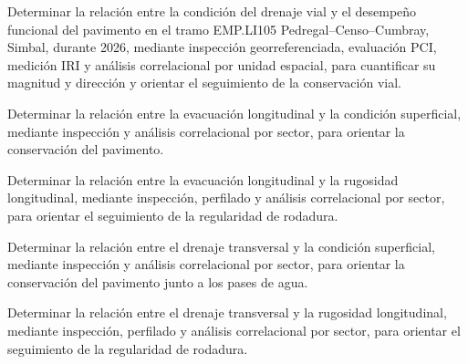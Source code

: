 

Determinar la relación entre la condición del drenaje vial y el desempeño funcional del pavimento en el tramo EMP.LI105 Pedregal–Censo–Cumbray, Simbal, durante 2026, mediante inspección georreferenciada, evaluación PCI, medición IRI y análisis correlacional por unidad espacial, para cuantificar su magnitud y dirección y orientar el seguimiento de la conservación vial.


\begin{listaTesis}
\item Determinar la relación entre la evacuación longitudinal y la condición superficial, mediante inspección y análisis correlacional por sector, para orientar la conservación del pavimento.
\item Determinar la relación entre la evacuación longitudinal y la rugosidad longitudinal, mediante inspección, perfilado y análisis correlacional por sector, para orientar el seguimiento de la regularidad de rodadura.
\item Determinar la relación entre el drenaje transversal y la condición superficial, mediante inspección y análisis correlacional por sector, para orientar la conservación del pavimento junto a los pases de agua.
\item Determinar la relación entre el drenaje transversal y la rugosidad longitudinal, mediante inspección, perfilado y análisis correlacional por sector, para orientar el seguimiento de la regularidad de rodadura.
\end{listaTesis}
